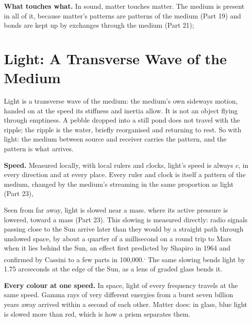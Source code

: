 \documentclass[11pt,a4paper]{article}
\begin{document}
\textbf{What touches what.} In sound, matter touches matter. The medium is present in all of it, because matter's patterns are patterns of the medium (Part 19) and bonds are kept up by exchanges through the medium (Part 21); 

\section{Light: A Transverse Wave of the Medium}

\begin{hypbar}
Light is a transverse wave of the medium: the medium's own sideways motion, handed on at the speed its stiffness and inertia allow. It is not an object flying through emptiness. A pebble dropped into a still pond does not travel with the ripple; the ripple is the water, briefly reorganised and returning to rest. So with light: the medium between source and receiver carries the pattern, and the pattern is what arrives.
\end{hypbar}

\textbf{Speed.} Measured locally, with local rulers and clocks, light's speed is always $c$, in every direction and at every place. Every ruler and clock is itself a pattern of the medium, changed by the medium's streaming in the same proportion as light (Part 23), 

Seen from far away, light is slowed near a mass.  where its active pressure is lowered, toward a mass (Part 23). This slowing is measured directly: radio signals passing close to the Sun arrive later than they would by a straight path through unslowed space, by about a quarter of a millisecond on a round trip to Mars when it lies behind the Sun, an effect first predicted by Shapiro in 1964 and confirmed by Cassini to a few parts in 100,000.\textsuperscript{,} The same slowing bends light by 1.75 arcseconds at the edge of the Sun, as a lens of graded glass bends it.

\textbf{Every colour at one speed.} In space, light of every frequency travels at the same speed. Gamma rays of very different energies from a burst seven billion years away arrived within a second of each other.  Matter does: in glass, blue light is slowed more than red, which is how a prism separates them.
\end{document}
